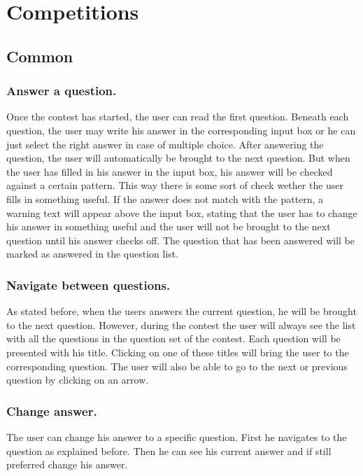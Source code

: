 \section{Competitions}

\subsection{Common}

\subsubsection{Answer a question.} 
Once the contest has started, the user can read the first question. Beneath each question, the user may write his answer in the corresponding input box or he can just select the right answer in case of multiple choice. After answering the question, the user will automatically be brought to the next question. But when the user has filled in his answer in the input box, his answer will be checked against a certain pattern. This way there is some sort of check wether the user fills in something useful. If the answer does not match with the pattern, a warning text will appear above the input box, stating that the user has to change his answer in something useful and the user will not be brought to the next question until his answer checks off. The question that has been answered will be marked as answered in the question list.

\subsubsection{Navigate between questions.} 
As stated before, when the users answers the current question, he will be brought to the next question. However, during the contest the user will always see the list with all the questions in the question set of the contest. Each question will be presented with his title. Clicking on one of these titles will bring the user to the corresponding question. The user will also be able to go to the next or previous question by clicking on an arrow. 

\subsubsection{Change answer.} 
The user can change his answer to a specific question. First he navigates to the question as explained before. Then he can see his current answer and if still preferred change his answer. 


